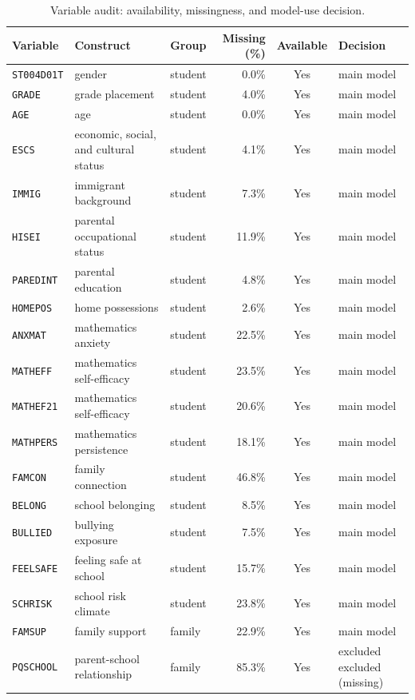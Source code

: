 \begin{table}[tb]
\centering
\caption{Variable audit: availability, missingness, and model-use decision.\label{tab:variables}}
\begin{tabular}{@{}lllrcl@{}}
\toprule
\textbf{Variable} & \textbf{Construct} & \textbf{Group} & \textbf{Missing (\%)} & \textbf{Available} & \textbf{Decision} \\
\midrule
  \texttt{ST004D01T} & gender & student & 0.0\% & Yes & main model \\
  \texttt{GRADE} & grade placement & student & 4.0\% & Yes & main model \\
  \texttt{AGE} & age & student & 0.0\% & Yes & main model \\
  \texttt{ESCS} & economic, social, and cultural status & student & 4.1\% & Yes & main model \\
  \texttt{IMMIG} & immigrant background & student & 7.3\% & Yes & main model \\
  \texttt{HISEI} & parental occupational status & student & 11.9\% & Yes & main model \\
  \texttt{PAREDINT} & parental education & student & 4.8\% & Yes & main model \\
  \texttt{HOMEPOS} & home possessions & student & 2.6\% & Yes & main model \\
  \texttt{ANXMAT} & mathematics anxiety & student & 22.5\% & Yes & main model \\
  \texttt{MATHEFF} & mathematics self-efficacy & student & 23.5\% & Yes & main model \\
  \texttt{MATHEF21} & mathematics self-efficacy & student & 20.6\% & Yes & main model \\
  \texttt{MATHPERS} & mathematics persistence & student & 18.1\% & Yes & main model \\
  \texttt{FAMCON} & family connection & student & 46.8\% & Yes & main model \\
  \texttt{BELONG} & school belonging & student & 8.5\% & Yes & main model \\
  \texttt{BULLIED} & bullying exposure & student & 7.5\% & Yes & main model \\
  \texttt{FEELSAFE} & feeling safe at school & student & 15.7\% & Yes & main model \\
  \texttt{SCHRISK} & school risk climate & student & 23.8\% & Yes & main model \\
  \texttt{FAMSUP} & family support & family & 22.9\% & Yes & main model \\
  \texttt{PQSCHOOL} & parent-school relationship & family & 85.3\% & Yes & excluded excluded (missing) \\

\end{tabular}
\end{table}
